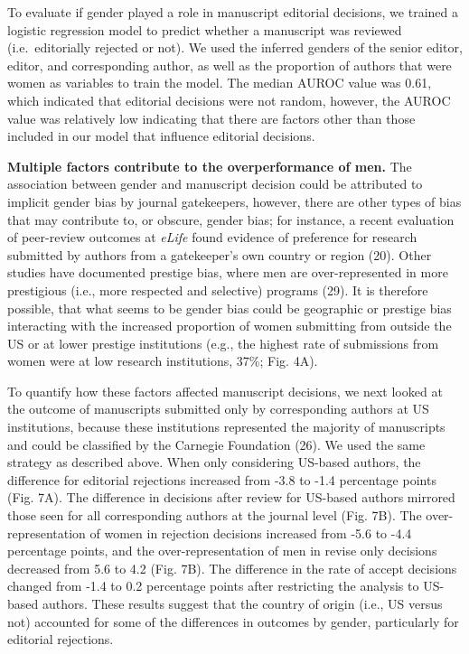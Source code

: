 \documentclass[11pt,]{article}
\begin{document}
To evaluate if gender played a role in manuscript editorial decisions,
we trained a logistic regression model to predict whether a manuscript
was reviewed (i.e.~editorially rejected or not). We used the inferred
genders of the senior editor, editor, and corresponding author, as well
as the proportion of authors that were women as variables to train the
model. The median AUROC value was 0.61, which indicated that editorial
decisions were not random, however, the AUROC value was relatively low
indicating that there are factors other than those included in our model
that influence editorial decisions.

\textbf{Multiple factors contribute to the overperformance of men.} The
association between gender and manuscript decision could be attributed
to implicit gender bias by journal gatekeepers, however, there are other
types of bias that may contribute to, or obscure, gender bias; for
instance, a recent evaluation of peer-review outcomes at \emph{eLife}
found evidence of preference for research submitted by authors from a
gatekeeper's own country or region (20). Other studies have documented
prestige bias, where men are over-represented in more prestigious (i.e.,
more respected and selective) programs (29). It is therefore possible,
that what seems to be gender bias could be geographic or prestige bias
interacting with the increased proportion of women submitting from
outside the US or at lower prestige institutions (e.g., the highest rate
of submissions from women were at low research institutions, 37\%; Fig.
4A).

To quantify how these factors affected manuscript decisions, we next
looked at the outcome of manuscripts submitted only by corresponding
authors at US institutions, because these institutions represented the
majority of manuscripts and could be classified by the Carnegie
Foundation (26). We used the same strategy as described above. When only
considering US-based authors, the difference for editorial rejections
increased from -3.8 to -1.4 percentage points (Fig. 7A). The difference
in decisions after review for US-based authors mirrored those seen for
all corresponding authors at the journal level (Fig. 7B). The
over-representation of women in rejection decisions increased from -5.6
to -4.4 percentage points, and the over-representation of men in revise
only decisions decreased from 5.6 to 4.2 (Fig. 7B). The difference in
the rate of accept decisions changed from -1.4 to 0.2 percentage points
after restricting the analysis to US-based authors. These results
suggest that the country of origin (i.e., US versus not) accounted for
some of the differences in outcomes by gender, particularly for
editorial rejections.
\end{document}
